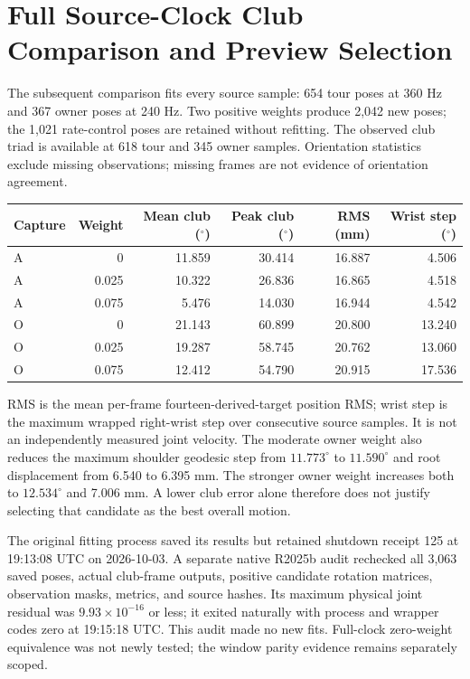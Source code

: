 \documentclass[11pt,a4paper]{article}
\begin{document}
\section{Full Source-Clock Club Comparison and Preview Selection}
\label{sec:global-club-comparison}
The subsequent comparison fits every source sample: 654 tour poses at
360 Hz and 367 owner poses at 240 Hz. Two positive weights produce 2,042
new poses; the 1,021 rate-control poses are retained without refitting.
The observed club triad is available at 618 tour and 345 owner samples.
Orientation statistics exclude missing observations; missing frames are
not evidence of orientation agreement.
\begin{center}
\begin{tabular}{lrrrrr}
\hline
Capture & Weight & Mean club ($^\circ$) & Peak club ($^\circ$) & RMS (mm) & Wrist step ($^\circ$)\\
\hline
A & 0 & 11.859 & 30.414 & 16.887 & 4.506\\
A & 0.025 & 10.322 & 26.836 & 16.865 & 4.518\\
A & 0.075 & 5.476 & 14.030 & 16.944 & 4.542\\
O & 0 & 21.143 & 60.899 & 20.800 & 13.240\\
O & 0.025 & 19.287 & 58.745 & 20.762 & 13.060\\
O & 0.075 & 12.412 & 54.790 & 20.915 & 17.536\\
\hline
\end{tabular}
\end{center}
RMS is the mean per-frame fourteen-derived-target position RMS; wrist
step is the maximum wrapped right-wrist step over consecutive source
samples. It is not an independently measured joint velocity. The moderate
owner weight also reduces the maximum shoulder geodesic step from
$11.773^\circ$ to $11.590^\circ$ and root displacement from 6.540 to
6.395 mm. The stronger owner weight increases both to $12.534^\circ$
and 7.006 mm. A lower club error alone therefore does not justify selecting
that candidate as the best overall motion.

The original fitting process saved its results but retained shutdown
receipt 125 at 19:13:08 UTC on 2026-10-03. A separate native R2025b
audit rechecked all 3,063 saved poses, actual club-frame outputs, positive
candidate rotation matrices, observation masks, metrics, and source hashes.
Its maximum physical joint residual was $9.93\times10^{-16}$ or less;
it exited naturally with process and wrapper codes zero at 19:15:18 UTC.
This audit made no new fits. Full-clock zero-weight equivalence was not
newly tested; the window parity evidence remains separately scoped.
\end{document}
